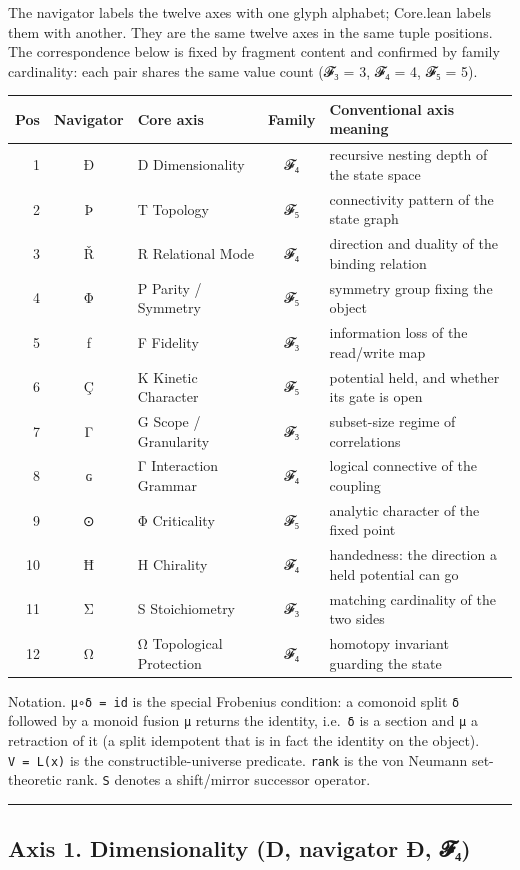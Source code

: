 The navigator labels the twelve axes with one glyph alphabet; Core.lean
labels them with another. They are the same twelve axes in the same
tuple positions. The correspondence below is fixed by fragment content
and confirmed by family cardinality: each pair shares the same value
count (𝓕₃ = 3, 𝓕₄ = 4, 𝓕₅ = 5).

\begin{longtable}[]{@{}rclcl@{}}
\toprule
Pos & Navigator & Core axis & Family & Conventional axis
meaning\tabularnewline
\midrule
\endhead
1 & Ð & D Dimensionality & 𝓕₄ & recursive nesting depth of the state
space\tabularnewline
2 & Þ & T Topology & 𝓕₅ & connectivity pattern of the state
graph\tabularnewline
3 & Ř & R Relational Mode & 𝓕₄ & direction and duality of the binding
relation\tabularnewline
4 & Φ & P Parity / Symmetry & 𝓕₅ & symmetry group fixing the
object\tabularnewline
5 & ƒ & F Fidelity & 𝓕₃ & information loss of the read/write
map\tabularnewline
6 & Ç & K Kinetic Character & 𝓕₅ & potential held, and whether its gate
is open\tabularnewline
7 & Γ & G Scope / Granularity & 𝓕₃ & subset-size regime of
correlations\tabularnewline
8 & ɢ & Γ Interaction Grammar & 𝓕₄ & logical connective of the
coupling\tabularnewline
9 & ⊙ & Φ Criticality & 𝓕₅ & analytic character of the fixed
point\tabularnewline
10 & Ħ & H Chirality & 𝓕₄ & handedness: the direction a held potential
can go\tabularnewline
11 & Σ & S Stoichiometry & 𝓕₃ & matching cardinality of the two
sides\tabularnewline
12 & Ω & Ω Topological Protection & 𝓕₄ & homotopy invariant guarding the
state\tabularnewline
\bottomrule
\end{longtable}

Notation. \texttt{μ∘δ\ =\ id} is the special Frobenius condition: a
comonoid split \texttt{δ} followed by a monoid fusion \texttt{μ} returns
the identity, i.e.~\texttt{δ} is a section and \texttt{μ} a retraction
of it (a split idempotent that is in fact the identity on the object).
\texttt{V\ =\ L(x)} is the constructible-universe predicate.
\texttt{rank} is the von Neumann set-theoretic rank. \texttt{S} denotes
a shift/mirror successor operator.

\begin{center}\rule{0.5\linewidth}{0.5pt}\end{center}

\hypertarget{axis-1.-dimensionality-d-navigator-uxf0-ux1d4d5ux2084}{%
\subsection{Axis 1. Dimensionality (D, navigator Ð,
𝓕₄)}\label{axis-1.-dimensionality-d-navigator-uxf0-ux1d4d5ux2084}}

